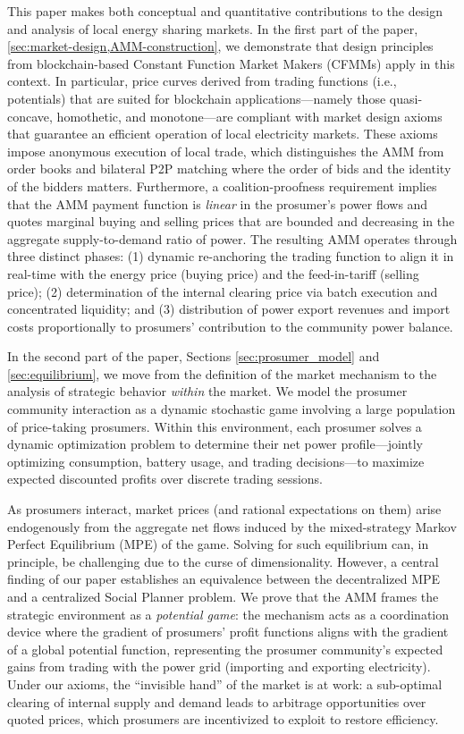 \documentclass[12pt, notitlepage]{article}
\begin{document}
This paper makes both conceptual and quantitative contributions to the design and analysis of local energy sharing markets.
In the first part of the paper, \cref{sec:market-design,AMM-construction}, we demonstrate that design principles from blockchain-based Constant Function Market Makers (CFMMs) apply in this context.
In particular, price curves derived from trading functions (i.e., potentials) that are suited for blockchain applications—namely those quasi-concave, homothetic, and monotone—are compliant with market design axioms that guarantee an efficient operation of local electricity markets.
These axioms impose anonymous execution of local trade, which distinguishes the AMM from order books and bilateral P2P matching where the order of bids and the identity of the bidders matters. Furthermore, a coalition-proofness requirement implies that the AMM payment function is \textit{linear} in the prosumer's power flows and quotes marginal buying and selling prices that are bounded and decreasing in the aggregate supply-to-demand ratio of power.
The resulting AMM operates through three distinct phases: (1) dynamic re-anchoring the trading function to align it in real-time with the energy price (buying price) and the feed-in-tariff (selling price); (2) determination of the internal clearing price via batch execution and concentrated liquidity; and (3) distribution of power export revenues and import costs proportionally to prosumers’ contribution to the community power balance. 

In the second part of the paper, Sections  \ref{sec:prosumer_model} and \ref{sec:equilibrium}, we move from the definition of the market mechanism to the analysis of strategic behavior \textit{within} the market. We model the prosumer community interaction as a dynamic stochastic game involving a large population of price-taking prosumers. Within this environment, each prosumer solves a dynamic optimization problem to determine their net power profile---jointly optimizing consumption, battery usage, and trading decisions---to maximize expected discounted profits over discrete trading sessions.

As prosumers interact, market prices (and rational expectations on them) arise endogenously from the aggregate net flows induced by the mixed-strategy Markov Perfect Equilibrium (MPE) of the game. Solving for such equilibrium can, in principle, be challenging due to the curse of dimensionality. However, a central finding of our paper establishes an equivalence between the decentralized MPE and a centralized Social Planner problem. We prove that the AMM frames the strategic environment as a \textit{potential game}: the mechanism acts as a coordination device where the gradient of prosumers' profit functions aligns with the gradient of a global potential function, representing the prosumer community's expected gains from trading with the power grid (importing and exporting electricity). Under our axioms, the ``invisible hand'' of the market is at work: a sub-optimal clearing of internal supply and demand leads to arbitrage opportunities over quoted prices, which prosumers are incentivized to exploit to restore efficiency.
\end{document}
